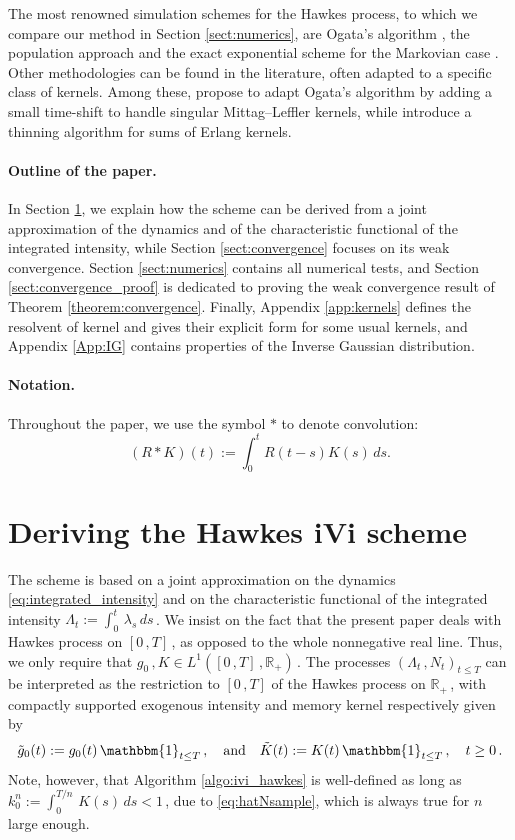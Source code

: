 \documentclass{article}
\newcommand{\R}{\mathbb{R}}
\newcommand{\1}{\mathbbm{1}}
\numberwithin{equation}{section}
\begin{document}
The most renowned simulation schemes for the Hawkes process, to which we compare our method in Section \ref{sect:numerics}, are Ogata's algorithm \citep{Ogata81}, the  population approach \citep{Moller2005} and the exact exponential scheme for the Markovian case \citep{Dassios13}. Other methodologies can be found in the literature, often adapted to a specific class of kernels. Among these, \citet*{Chen2021} propose to adapt Ogata's algorithm by adding a small time-shift to handle singular Mittag--Leffler kernels, while \citet*{Duarte} introduce a thinning algorithm for sums of Erlang kernels. %


\paragraph{Outline of the paper.} In Section \ref{sect:scheme_motivation}, we explain how the scheme can be derived from a joint approximation of the dynamics and of the characteristic functional of the integrated intensity, while Section \ref{sect:convergence} focuses on its weak convergence. Section \ref{sect:numerics} contains all numerical tests, and Section \ref{sect:convergence_proof} is dedicated to proving the weak convergence result of Theorem \ref{theorem:convergence}. Finally, Appendix \ref{app:kernels} defines the resolvent of kernel and gives their explicit form for some usual kernels, and Appendix \ref{App:IG} contains properties of the Inverse Gaussian distribution.

{\paragraph{Notation.} Throughout the paper, we use the symbol $*$ to denote convolution: 
$$
 (R*K)(t) := \int_0^tR(t-s)K(s)\,ds.
$$
}


\section{Deriving the Hawkes iVi scheme}\label{sect:scheme_motivation}
The scheme is based on a joint approximation on the dynamics \eqref{eq:integrated_intensity} and on the characteristic functional of the integrated intensity $\Lambda_t := \int_0^t\,\lambda_s\,ds\,$. We insist on the fact that the present paper deals with Hawkes process on $[0\,,T]\,$, as opposed to the whole nonnegative real line. Thus, we only require that $g_0\,,K \in L^1([0\,,T]\,,\R_+)\,$. The processes $\left(\Lambda_t\,,N_t\right)_{t \leq T}$ can be interpreted as the restriction to $[0\,,T]$ of the Hawkes process on $\R_+\,$, with compactly supported exogenous intensity and memory kernel respectively given by 
$$
\tilde g_0(t) := g_0(t)\,\1_{t \leq T}\,, \quad \text{and}\quad \tilde K(t) := K(t)\,\1_{t \leq T}\,, \quad t \geq 0\,.
$$
Note, however, that Algorithm \ref{algo:ivi_hawkes} is well-defined as long as $k_0^n := \int_0^{T/n}\,K(s)\,ds < 1\,$, due to \eqref{eq:hatNsample}, which is always true for $n$ large enough.
\end{document}
